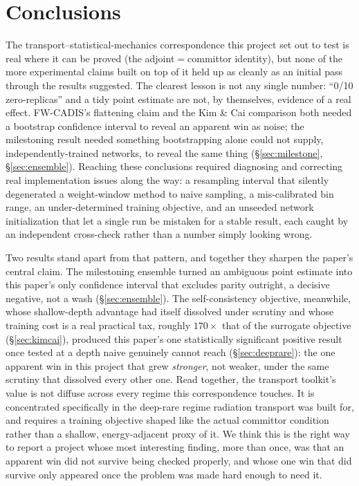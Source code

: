 \documentclass[a4paper,fleqn]{cas-sc}
\begin{document}
\section{Conclusions}\label{sec:conclusions}
The transport--statistical-mechanics correspondence this project set out to test is real
where it can be proved (the adjoint$=$committor identity), but none of the more
experimental claims built on top of it held up as cleanly as an initial pass through the
results suggested. The clearest lesson is not any single number: ``0/10 zero-replicas''
and a tidy point estimate are not, by themselves, evidence of a real effect. FW-CADIS's
flattening claim and the Kim \& Cai comparison both needed a bootstrap confidence interval
to reveal an apparent win as noise; the milestoning result needed something bootstrapping
alone could not supply, independently-trained networks, to reveal the same thing
(\S\ref{sec:milestone}, \S\ref{sec:ensemble}). Reaching these conclusions required
diagnosing and correcting real implementation issues along the way: a resampling
interval that silently degenerated a weight-window method to naive sampling, a
mis-calibrated bin range, an under-determined training objective, and an unseeded
network initialization that let a single run be mistaken for a stable result, each
caught by an independent cross-check rather than a number simply looking wrong.

Two results stand apart from that pattern, and together they sharpen the paper's central
claim. The milestoning ensemble turned an ambiguous point estimate into this paper's only
confidence interval that excludes parity outright, a decisive negative, not a wash
(\S\ref{sec:ensemble}). The self-consistency objective, meanwhile, whose shallow-depth
advantage had itself dissolved under scrutiny and whose training cost is a real practical
tax, roughly $170\times$ that of the surrogate objective (\S\ref{sec:kimcai}), produced this paper's
one statistically significant positive result once tested at a depth naive genuinely
cannot reach (\S\ref{sec:deeprare}): the one apparent win in this project that grew
\emph{stronger}, not weaker, under the same scrutiny that dissolved every other one. Read
together, the transport toolkit's value is not diffuse across every regime this
correspondence touches. It is concentrated specifically in the deep-rare regime radiation
transport was built for, and requires a training objective shaped like the actual
committor condition rather than a shallow, energy-adjacent proxy of it. We think this is
the right way to report a project whose most interesting finding, more than once, was
that an apparent win did not survive being checked properly, and whose one win that did
survive only appeared once the problem was made hard enough to need it.
\end{document}
